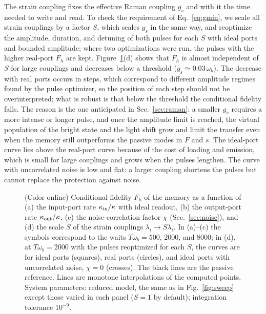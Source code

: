 \documentclass[aps,pra,preprint,groupedaddress,amsmath,amssymb,floatfix]{revtex4-2}
\begin{document}
The strain coupling fixes the effective Raman coupling $g_s$ and with it the time needed to write and read. To check the requirement of Eq.~\eqref{eq:gmin}, we scale all strain couplings by a factor $S$, which scales $g_s$ in the same way, and reoptimize the amplitude, duration, and detuning of both pulses for each $S$ with ideal ports and bounded amplitude; where two optimizations were run, the pulses with the higher real-port $F_h$ are kept. Figure~\ref{fig:ports}(d) shows that $F_h$ is almost independent of $S$ for large couplings and decreases below a threshold ($g_s\simeq0.03\,\omega_b$). The decrease with real ports occurs in steps, which correspond to different amplitude regimes found by the pulse optimizer, so the position of each step should not be overinterpreted; what is robust is that below the threshold the conditional fidelity falls. The reason is the one anticipated in Sec.~\ref{sec:raman}: a smaller $g_s$ requires a more intense or longer pulse, and once the amplitude limit is reached, the virtual population of the bright state and the light shift grow and limit the transfer even when the memory still outperforms the passive modes in $F$ and $s$. The ideal-port curve lies above the real-port curve because of the cost of loading and emission, which is small for large couplings and grows when the pulses lengthen. The curve with uncorrelated noise is low and flat: a larger coupling shortens the pulses but cannot replace the protection against noise.

\begin{figure}[t]
\centering
\resizebox{\columnwidth}{!}{}
\caption{(Color online) Conditional fidelity $F_h$ of the memory as a function of (a) the input-port rate $\kappa_{\rm in}/\kappa$ with ideal readout, (b) the output-port rate $\kappa_{\rm out}/\kappa$, (c) the noise-correlation factor $\chi$ (Sec.~\ref{sec:noise}), and (d) the scale $S$ of the strain couplings $\lambda_i\to S\lambda_i$. In (a)--(c) the symbols correspond to the waits $T\omega_b=500$, $2000$, and $8000$; in (d), at $T\omega_b=2000$ with the pulses reoptimized for each $S$, the curves are for ideal ports (squares), real ports (circles), and ideal ports with uncorrelated noise, $\chi=0$ (crosses). The black lines are the passive reference. Lines are monotone interpolations of the computed points. System parameters: reduced model, the same as in Fig.~\ref{fig:sweep} except those varied in each panel ($S=1$ by default); integration tolerance $10^{-9}$.}
\label{fig:ports}
\end{figure}
\end{document}
